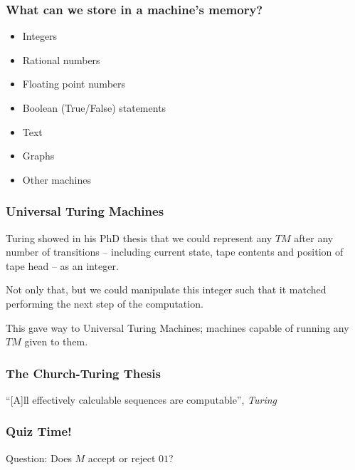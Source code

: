 \documentclass[aspectratio=169]{beamer}
\begin{document}
\begin{frame}
\frametitle{What can we store in a machine's memory?}
\begin{itemize}
    \item<1-> Integers
    \item<2-> Rational numbers
    \item<3-> Floating point numbers
    \item<4-> Boolean (True/False) statements
    \item<5-> Text
    \item<6-> Graphs
    \item<7-> Other machines
\end{itemize}
\end{frame}

\begin{frame}
\frametitle{Universal Turing Machines}
Turing showed in his PhD thesis that we could represent any $TM$ after any number of transitions -- including current state, tape contents and position of tape head -- as an integer.

Not only that, but we could manipulate this integer such that it matched performing the next step of the computation.

This gave way to Universal Turing Machines; machines capable of running any $TM$ given to them.
\end{frame}

\begin{frame}
\frametitle{The Church-Turing Thesis}
\centerline{``[A]ll effectively calculable sequences are computable'', {\em Turing}}
\end{frame}

\begin{frame}
\frametitle{Quiz Time!}

\begin{center}
\end{center}

Question: Does $M$ accept or reject $01$?
\end{frame}
\end{document}
